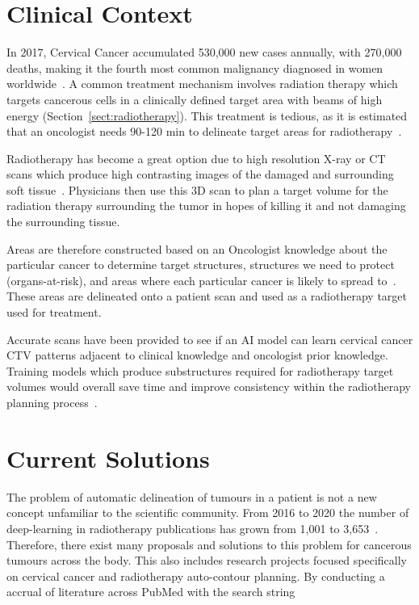 \documentclass[11pt,twoside]{report}
\begin{document}
\setcounter{page}{1}
\fancyhead[LE,RO]{\slshape \rightmark}
\fancyhead[LO,RE]{\slshape \leftmark}

\section{Clinical Context}

In 2017, Cervical Cancer accumulated 530,000 new cases annually, with 270,000 deaths, making it the fourth most common malignancy diagnosed in women worldwide~\cite{cervical-cancer-epidemic}. A common treatment mechanism involves radiation therapy which targets cancerous cells in a clinically defined target area with beams of high energy (Section~\ref{sect:radiotherapy}). This treatment is tedious, as it is estimated that an oncologist needs 90-120 min to delineate target areas for radiotherapy~\cite{LIU2020184}.

Radiotherapy has become a great option due to high resolution X-ray or CT scans which produce high contrasting images of the damaged and surrounding soft tissue~\cite{radiotherapy-basic-concepts}. Physicians then use this 3D scan to plan a target volume for the radiation therapy surrounding the tumor in hopes of killing it and not damaging the surrounding tissue.

Areas are therefore constructed based on an Oncologist knowledge about the particular cancer to determine target structures, structures we need to protect (organs-at-risk), and areas where each particular cancer is likely to spread to~\cite{AMLART-data}. These areas are delineated onto a patient scan and used as a radiotherapy target used for treatment.

Accurate scans have been provided to see if an AI model can learn cervical cancer CTV patterns adjacent to clinical knowledge and oncologist prior knowledge. Training models which produce substructures required for radiotherapy target volumes would overall save time and improve consistency within the radiotherapy planning process~\cite{AMLART-data}.

\section{Current Solutions}\label{sect:current-solutions}

The problem of automatic delineation of tumours in a patient is not a new concept unfamiliar to the scientific community. From 2016 to 2020 the number of deep-learning in radiotherapy publications has grown from 1,001 to 3,653~\cite{Lin2021-oz}. Therefore, there exist many proposals and solutions to this problem for cancerous tumours across the body. This also includes research projects focused specifically on cervical cancer and radiotherapy auto-contour planning. By conducting a accrual of literature across PubMed with the search string
\end{document}
